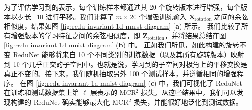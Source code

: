 \documentclass[../../book-main.tex]{subfiles}
\begin{document}
\begin{example}[数字的不变分类]
为了评估学习到的表示，每个训练样本都通过其 20 个旋转版本进行增强，每个版本以步长=10 进行平移。我们计算了 $m \times 20$ 个增强训练输入 $\bm{X}_{\text{rotation}}$ 之间的余弦相似度，结果如图 \ref{fig:redu-invariant-1d-mnist-diagram} (\textbf{a}) 所示。
我们比较了所有增强版本的学习特征之间的余弦相似度，即 $\bar{\bm{Z}}_{\text{rotation}}$，并将结果总结在图 \ref{fig:redu-invariant-1d-mnist-diagram} (\textbf{b}) 中。
正如我们所见，如此构建的旋转不变 ReduNet 能够将来自 10 个不同类别的训练数据（以及其所有旋转版本）映射到 10 个几乎正交的子空间中。也就是说，学习到的子空间对极角上的平移变换是真正不变的。接下来，我们随机抽取另外 100 个测试样本，并遵循相同的增强程序。
在图 \ref{fig:redu-invariant-1d-mnist-diagram} (\textbf{c}) 中，我们可视化了 ReduNet 在训练和测试数据集上第 $\ell$ 层表示的 MCR$^{2}$ 损失。从这些结果中，我们可以发现构建的 ReduNet 确实能够最大化 MCR$^{2}$ 损失，并能很好地泛化到测试数据。




\end{example}
\end{document}
